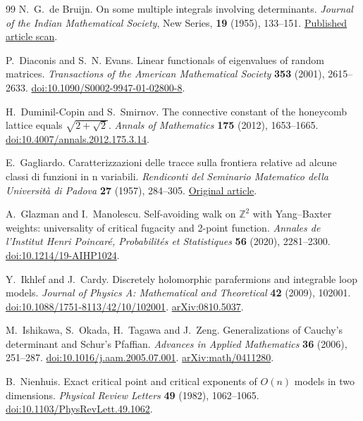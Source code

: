 \begin{thebibliography}{99}
N.~G.~de Bruijn.
On some multiple integrals involving determinants.
\emph{Journal of the Indian Mathematical Society}, New Series,
\textbf{19} (1955), 133--151.
\href{https://pure.tue.nl/ws/files/1920642/597510.pdf}{Published article scan}.

P.~Diaconis and S.~N. Evans.
Linear functionals of eigenvalues of random matrices.
\emph{Transactions of the American Mathematical Society}
\textbf{353} (2001), 2615--2633.
\mbox{\href{https://doi.org/10.1090/S0002-9947-01-02800-8}{doi:10.1090/S0002-9947-01-02800-8}}.

H.~Duminil-Copin and S.~Smirnov.
The connective constant of the honeycomb lattice equals $\sqrt{2+\sqrt2}$.
\emph{Annals of Mathematics} \textbf{175} (2012), 1653--1665.
\href{https://doi.org/10.4007/annals.2012.175.3.14}{doi:10.4007/annals.2012.175.3.14}.

E.~Gagliardo.
Caratterizzazioni delle tracce sulla frontiera relative ad alcune
classi di funzioni in n variabili.
\emph{Rendiconti del Seminario Matematico della Universit\`a di Padova}
\textbf{27} (1957), 284--305.
\href{https://www.numdam.org/item/RSMUP_1957__27__284_0/}{Original article}.

A.~Glazman and I.~Manolescu.
Self-avoiding walk on $\mathbb Z^2$ with Yang--Baxter weights: universality of critical fugacity and 2-point function.
\emph{Annales de l'Institut Henri Poincar\'e, Probabilit\'es et Statistiques}
\textbf{56} (2020), 2281--2300.
\href{https://doi.org/10.1214/19-AIHP1024}{doi:10.1214/19-AIHP1024}.

Y.~Ikhlef and J.~Cardy.
Discretely holomorphic parafermions and integrable loop models.
\emph{Journal of Physics A: Mathematical and Theoretical}
\textbf{42} (2009), 102001.
\href{https://doi.org/10.1088/1751-8113/42/10/102001}{doi:10.1088/1751-8113/42/10/102001}.
\href{https://arxiv.org/abs/0810.5037}{arXiv:0810.5037}.

M.~Ishikawa, S.~Okada, H.~Tagawa and J.~Zeng.
Generalizations of Cauchy's determinant and Schur's Pfaffian.
\emph{Advances in Applied Mathematics} \textbf{36} (2006), 251--287.
\href{https://doi.org/10.1016/j.aam.2005.07.001}{doi:10.1016/j.aam.2005.07.001}.
\href{https://arxiv.org/abs/math/0411280}{arXiv:math/0411280}.

B.~Nienhuis.
Exact critical point and critical exponents of $O(n)$ models in two dimensions.
\emph{Physical Review Letters} \textbf{49} (1982), 1062--1065.
\href{https://doi.org/10.1103/PhysRevLett.49.1062}{doi:10.1103/PhysRevLett.49.1062}.


\end{thebibliography}
